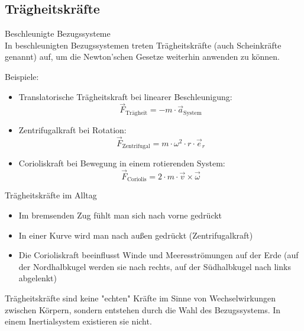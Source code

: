 \subsection{Trägheitskräfte}
\begin{concept}{Beschleunigte Bezugssysteme}\\
    In beschleunigten Bezugssystemen treten Trägheitskräfte (auch Scheinkräfte genannt) auf, um die Newton'schen Gesetze weiterhin anwenden zu können.
    
    Beispiele:
    \begin{itemize}
        \item Translatorische Trägheitskraft bei linearer Beschleunigung:
        \begin{equation}
            \vec{F}_{\text{Trägheit}} = -m \cdot \vec{a}_{\text{System}}
        \end{equation}
        
        \item Zentrifugalkraft bei Rotation:
        \begin{equation}
            \vec{F}_{\text{Zentrifugal}} = m \cdot \omega^2 \cdot r \cdot \vec{e}_r
        \end{equation}
        
        \item Corioliskraft bei Bewegung in einem rotierenden System:
        \begin{equation}
            \vec{F}_{\text{Coriolis}} = 2 \cdot m \cdot \vec{v} \times \vec{\omega}
        \end{equation}
    \end{itemize}
\end{concept}

\begin{example2}{Trägheitskräfte im Alltag}\\
    \begin{itemize}
        \item Im bremsenden Zug fühlt man sich nach vorne gedrückt
        \item In einer Kurve wird man nach außen gedrückt (Zentrifugalkraft)
        \item Die Corioliskraft beeinflusst Winde und Meeresströmungen auf der Erde (auf der Nordhalbkugel werden sie nach rechts, auf der Südhalbkugel nach links abgelenkt)
    \end{itemize}
\end{example2}

\begin{remark}
    Trägheitskräfte sind keine "echten" Kräfte im Sinne von Wechselwirkungen zwischen Körpern, sondern entstehen durch die Wahl des Bezugssystems. In einem Inertialsystem existieren sie nicht.
\end{remark}